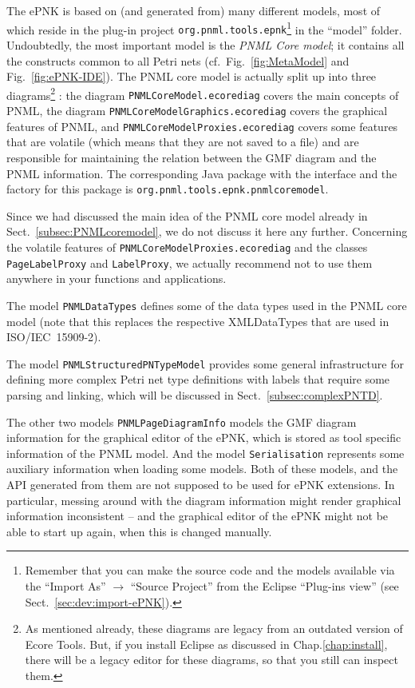 %
The ePNK is based on (and generated from) many different models, most of
which reside in the plug-in project {\tt org.pnml.tools.epnk}\footnote
  {Remember that you can make the source code and the models available
   via the ``Import As'' $\rightarrow$ ``Source Project'' from the
   Eclipse ``Plug-ins view'' (see Sect.~\ref{sec:dev:import-ePNK}).}
in the ``model'' folder. Undoubtedly, the most important model is the
\emph{PNML Core model}; it contains all the constructs common to all
Petri nets (cf.\ Fig.~\ref{fig:MetaModel} and Fig.~\ref{fig:ePNK-IDE}).
The PNML core model is actually split up into three diagrams\footnote
  {As mentioned already, these diagrams are legacy from an outdated
   version of Ecore Tools. But, if you install Eclipse as discussed
   in Chap.\ref{chap:install}, there will be a legacy editor for these
   diagrams, so that you still can inspect them.}%
: the diagram
{\tt PNMLCoreModel.ecorediag} covers the main concepts of PNML, the
diagram {\tt PNMLCoreModelGraphics.ecorediag} covers the graphical features
of PNML, and {\tt PNMLCoreModelProxies.ecorediag} covers some features
that are volatile (which means that they are not saved to a file) and
are responsible for maintaining the relation between the GMF diagram
and the PNML information. The corresponding Java package with the interface
and the factory for this package is {\tt org.pnml.tools.epnk.pnmlcoremodel}.

Since we had discussed the main idea of the PNML core model already in
Sect.~\ref{subsec:PNMLcoremodel}, we do not discuss it here any further.
Concerning the volatile features of  {\tt PNMLCoreModelProxies.ecorediag}
and the classes {\tt PageLabelProxy} and {\tt LabelProxy}, we actually
recommend not to use them anywhere in your functions and applications.

The model {\tt PNMLDataTypes} defines some of the data types used in
the PNML core model (note that this replaces the respective XMLDataTypes
that are used in ISO/IEC~15909-2).%

The model {\tt PNMLStructuredPNTypeModel} provides some general infrastructure
for defining more complex Petri net type definitions with labels that require
some parsing and linking, which will be discussed in Sect.~\ref{subsec:complexPNTD}.

The other two models {\tt PNMLPageDiagramInfo} models the GMF diagram information
for the graphical editor of the ePNK, which is stored as tool specific
information of the PNML model. And the model {\tt Serialisation} represents some auxiliary
information when loading some models. Both of these models, and the API
generated from them are not supposed to be used for ePNK extensions. In particular,
messing around with the diagram information might render graphical information
inconsistent -- and the graphical editor of the ePNK might not be able to start
up again, when this is changed manually. 

